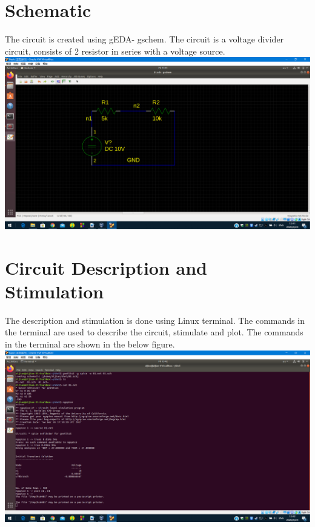 \documentclass{article}
\begin{document}
\section{Schematic}
The circuit is created using gEDA- gschem. The circuit is a voltage divider circuit, consists of 2 resistor in series with a voltage source. \\
\includegraphics[width=1\textwidth]{sch.png}

\section{Circuit Description and Stimulation}
The description and stimulation is done using Linux terminal. The commands in the terminal are used to describe the circuit, stimulate and plot. The commands in the terminal are shown in the below figure. \\ 
\includegraphics[width=1\textwidth]{terminal.png}

\newpage
\end{document}
